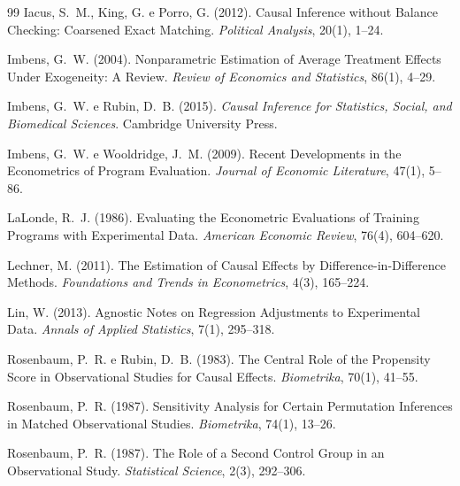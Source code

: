 \documentclass[12pt,a4paper]{article}
\begin{document}
\begin{thebibliography}{99}
Iacus, S.~M., King, G. e Porro, G. (2012).
\newblock Causal Inference without Balance Checking: Coarsened Exact Matching.
\newblock \textit{Political Analysis}, 20(1), 1--24.

Imbens, G.~W. (2004).
\newblock Nonparametric Estimation of Average Treatment Effects Under Exogeneity: A Review.
\newblock \textit{Review of Economics and Statistics}, 86(1), 4--29.

Imbens, G.~W. e Rubin, D.~B. (2015).
\newblock \textit{Causal Inference for Statistics, Social, and Biomedical Sciences}.
\newblock Cambridge University Press.

Imbens, G.~W. e Wooldridge, J.~M. (2009).
\newblock Recent Developments in the Econometrics of Program Evaluation.
\newblock \textit{Journal of Economic Literature}, 47(1), 5--86.

LaLonde, R.~J. (1986).
\newblock Evaluating the Econometric Evaluations of Training Programs with Experimental Data.
\newblock \textit{American Economic Review}, 76(4), 604--620.

Lechner, M. (2011).
\newblock The Estimation of Causal Effects by Difference-in-Difference Methods.
\newblock \textit{Foundations and Trends in Econometrics}, 4(3), 165--224.

Lin, W. (2013).
\newblock Agnostic Notes on Regression Adjustments to Experimental Data.
\newblock \textit{Annals of Applied Statistics}, 7(1), 295--318.

Rosenbaum, P.~R. e Rubin, D.~B. (1983).
\newblock The Central Role of the Propensity Score in Observational Studies for Causal Effects.
\newblock \textit{Biometrika}, 70(1), 41--55.

Rosenbaum, P.~R. (1987).
\newblock Sensitivity Analysis for Certain Permutation Inferences in Matched Observational Studies.
\newblock \textit{Biometrika}, 74(1), 13--26.

Rosenbaum, P.~R. (1987).
\newblock The Role of a Second Control Group in an Observational Study.
\newblock \textit{Statistical Science}, 2(3), 292--306.


\end{thebibliography}
\end{document}

